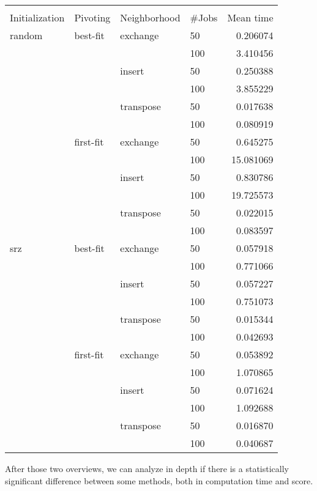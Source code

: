 \documentclass[a4paper]{article}
\begin{document}
\begin{center}
\begin{tabular}{llllr}
\toprule
       &      &          &     &        \\
Initialization & Pivoting & Neighborhood  & \#Jobs &  Mean time  \\
\midrule
random & best-fit & exchange & 50  &   0.206074 \\
       &      &          & 100 &   3.410456 \\
       &      & insert & 50  &   0.250388 \\
       &      &          & 100 &   3.855229 \\
       &      & transpose & 50  &   0.017638 \\
       &      &          & 100 &   0.080919 \\
       & first-fit & exchange & 50  &   0.645275 \\
       &      &          & 100 &  15.081069 \\
       &      & insert & 50  &   0.830786 \\
       &      &          & 100 &  19.725573 \\
       &      & transpose & 50  &   0.022015 \\
       &      &          & 100 &   0.083597 \\
srz & best-fit & exchange & 50  &   0.057918 \\
       &      &          & 100 &   0.771066 \\
       &      & insert & 50  &   0.057227 \\
       &      &          & 100 &   0.751073 \\
       &      & transpose & 50  &   0.015344 \\
       &      &          & 100 &   0.042693 \\
       & first-fit & exchange & 50  &   0.053892 \\
       &      &          & 100 &   1.070865 \\
       &      & insert & 50  &   0.071624 \\
       &      &          & 100 &   1.092688 \\
       &      & transpose & 50  &   0.016870 \\
       &      &          & 100 &   0.040687 \\
\bottomrule
\end{tabular}
\end{center}


After those two overviews, we can analyze in depth if there is a statistically significant difference between some methods, both in computation time and score.
\end{document}
